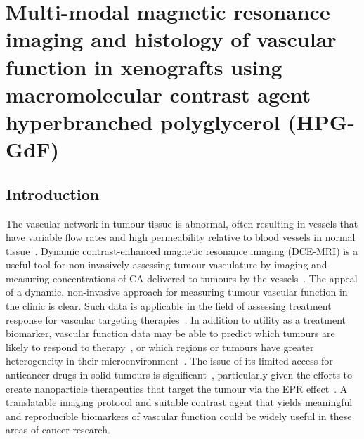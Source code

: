 
\chapter[MRI and histology of vascular function in xenografts using \acs{HPG-GdF}]{Multi-modal magnetic resonance imaging and histology of vascular function in xenografts using macromolecular contrast agent hyperbranched polyglycerol (HPG-GdF)}
\label{ch:HPG}

\section{Introduction}
The vascular network in tumour tissue is abnormal, often resulting in vessels that have variable flow rates and high permeability relative to blood vessels in normal tissue~\cite{McDonald:2002ut}.
Dynamic contrast-enhanced magnetic resonance imaging (DCE-MRI) is a useful tool for non-invasively assessing tumour vasculature by imaging and measuring concentrations of \acs{CA} delivered to tumours by the vessels~\cite{OConnor:2012ie,Barrett:2006jx,Leach:2003fy}.
The appeal of a dynamic, non-invasive approach for measuring tumour vascular function in the clinic is clear.
Such data is applicable in the field of assessing treatment response for vascular targeting therapies~\cite{OConnor:2012ie,Barrett:2006jx,Leach:2003fy}.
In addition to utility as a treatment biomarker, vascular function data may be able to predict which tumours are likely to respond to therapy~\cite{DeBruyne:2012cq,Kelly:2011cf,Bains:2009hh}, or which regions or tumours have greater heterogeneity in their microenvironment~\cite{OConnor:2011jm,Alic:2011hw}.
The issue of its limited access for anticancer drugs in solid tumours is significant~\cite{Minchinton:2006gs}, particularly given the efforts to create nanoparticle therapeutics that target the tumour via the \acs{EPR} effect~\cite{Jain:2001uf,Iyer:2006gf,Chauhan:2011fi}.
A translatable imaging protocol and suitable contrast agent that yields meaningful and reproducible biomarkers of vascular function could be widely useful in these areas of cancer research.

